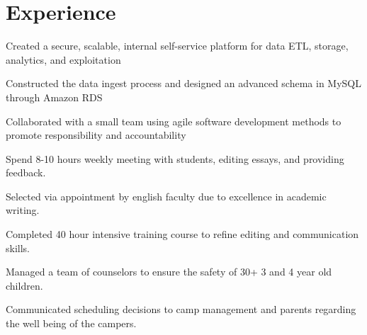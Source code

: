 \documentclass{resume}
\begin{document}
\begin{minipage}[t]{0.66\textwidth}


\section{Experience}

\vspace{1.25\topsep} %
\begin{tightemize}
\item Created a secure, scalable, internal self-service platform for data ETL, storage, analytics, and exploitation
\item Constructed the data ingest process and designed an advanced schema in MySQL through Amazon RDS
\item Collaborated with a small team using agile software development methods to promote responsibility and accountability
\end{tightemize}
\sectionsep

\begin{tightemize}
\item Spend 8-10 hours weekly meeting with students, editing essays, and providing feedback. 
\item Selected via appointment by english faculty due to excellence in academic writing.
\item Completed 40 hour intensive training course to refine editing  and communication skills.
\end{tightemize}
\sectionsep


\begin{tightemize}
\item Managed a team of counselors to ensure the safety of 30+ 3 and 4 year old children.
\item Communicated scheduling decisions to camp management and parents regarding the well being of the campers. 
\end{tightemize}
\sectionsep


\end{minipage}
\end{document}
